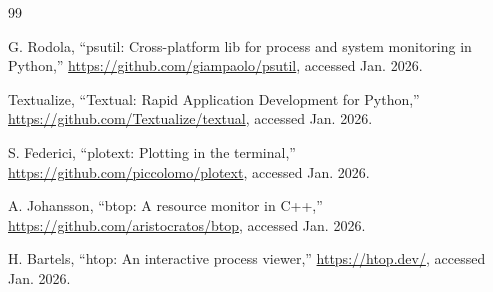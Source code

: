 \documentclass[12pt,a4paper,oneside]{report}
\begin{document}

{}
\begin{thebibliography}{99}

G. Rodola, ``psutil: Cross-platform lib for process and system monitoring in Python,'' \url{https://github.com/giampaolo/psutil}, accessed Jan. 2026.

Textualize, ``Textual: Rapid Application Development for Python,'' \url{https://github.com/Textualize/textual}, accessed Jan. 2026.

S. Federici, ``plotext: Plotting in the terminal,'' \url{https://github.com/piccolomo/plotext}, accessed Jan. 2026.

A. Johansson, ``btop: A resource monitor in C++,'' \url{https://github.com/aristocratos/btop}, accessed Jan. 2026.

H. Bartels, ``htop: An interactive process viewer,'' \url{https://htop.dev/}, accessed Jan. 2026.

\end{thebibliography}
\end{document}
